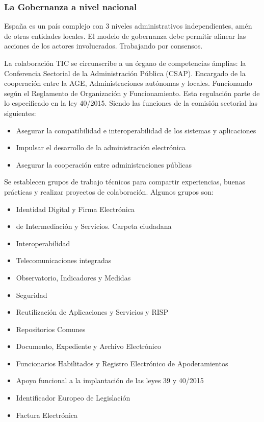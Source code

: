     \subsubsection{La Gobernanza a nivel nacional}
        España es un país complejo con 3 niveles administrativos independientes, amén de otras entidades locales. El modelo de gobernanza debe permitir alinear las acciones de los actores involucrados. Trabajando por consensos.

        La colaboración TIC se circunscribe a un órgano de competencias ámplias: la Conferencia Sectorial de la Administración Pública (CSAP). Encargado de la cooperación entre la AGE, Administraciones autónomas y locales. Funcionando según el Reglamento de Organización y Funcionamiento. Esta regulación parte de lo especificado en la ley 40/2015. Siendo las funciones de la comisión sectorial las siguientes:
        \begin{itemize}
            \item Asegurar la compatibilidad e interoperabilidad de los sistemas y aplicaciones
            \item Impulsar el desarrollo de la administración electrónica
            \item Asegurar la cooperación entre administraciones públicas
        \end{itemize}

        Se establecen grupos de trabajo técnicos para compartir experiencias, buenas prácticas y realizar proyectos de colaboración. Algunos grupos son:
        \begin{itemize}
            \item Identidad Digital y Firma Electrónica
            \item de Intermediación y Servicios. Carpeta ciudadana
            \item Interoperabilidad
            \item Telecomunicaciones integradas
            \item Observatorio, Indicadores y Medidas
            \item Seguridad
            \item Reutilización de Aplicaciones y Servicios y RISP
            \item Repositorios Comunes
            \item Documento, Expediente y Archivo Electrónico
            \item Funcionarios Habilitados y Registro Electrónico de Apoderamientos
            \item Apoyo funcional a la implantación de las leyes 39 y 40/2015
            \item Identificador Europeo de Legislación
            \item Factura Electrónica
        \end{itemize}

